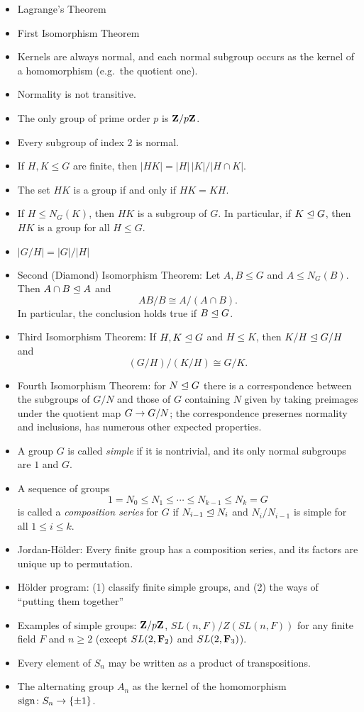 \begin{itemize}
\item Lagrange's Theorem
\item First Isomorphism Theorem
\item Kernels are always normal, and each normal subgroup occurs as the kernel of a homomorphism (e.g.\ the quotient one).
\item Normality is not transitive.
\item The only group of prime order $p$ is $\mathbf{Z}/p\mathbf{Z}$.
\item Every subgroup of index 2 is normal.
\item If $H, K \leq G$ are finite, then $|H K| = |H| \, |K|/|H \cap K|$.
\item The set $H K$ is a group if and only if $H K = K H$.
\item If $H \leq N_G(K)$, then $H K$ is a subgroup of $G$. In particular, if $K \trianglelefteq G$, then $H K$ is a group for all $H \leq G$.
\item $|G/H| = |G|/|H|$
\item Second (Diamond) Isomorphism Theorem: Let $A, B \leq G$ and $A \leq N_G(B)$. Then $A \cap B \trianglelefteq A$ and
  \[
  A B/B \cong A/(A \cap B).
  \]
  In particular, the conclusion holds true if $B \trianglelefteq G$.
\item Third Isomorphism Theorem: If $H, K \trianglelefteq G$ and $H \leq K$, then $K/H \trianglelefteq G/H$ and
  \[
  (G/H)/(K/H) \cong G/K.
  \]
\item Fourth Isomorphism Theorem: for $N \trianglelefteq G$ there is a correspondence between the subgroups of $G/N$ and those of $G$ containing $N$ given by taking preimages under the quotient map $G \rightarrow G/N$; the correspondence presernes normality and inclusions, has numerous other expected properties.
\item A group $G$ is called \emph{simple} if it is nontrivial, and its only normal subgroups are $1$ and $G$.
\item A sequence of groups
  \[
  1 = N_0 \leq N_1 \leq \cdots \leq N_{k-1} \leq N_k = G
  \]
  is called a \emph{composition series} for $G$ if $N_{i-1} \trianglelefteq N_i$ and $N_i/N_{i-1}$ is simple for all $1 \leq i \leq k$.
\item Jordan-H\"older: Every finite group has a composition series, and its factors are unique up to permutation.
\item H\"older program: (1) classify finite simple groups, and (2) the ways of ``putting them together''
\item Examples of simple groups: $\mathbf{Z}/p\mathbf{Z}$, $SL(n, F)/Z(SL(n,F))$ for any finite field $F$ and $n \geq 2$ (except $SL(2,\mathbf{F}_2)$ and $SL(2,\mathbf{F}_3)$).
\item Every element of $S_n$ may be written as a product of transpositions.
\item The alternating group $A_n$ as the kernel of the homomorphism $\operatorname{sign} \colon S_n \rightarrow \{\pm 1\}$.
\end{itemize}

